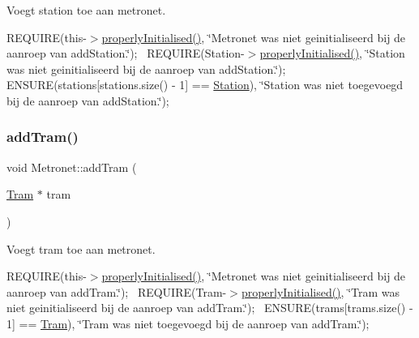 Voegt station toe aan metronet. 

R\+E\+Q\+U\+I\+RE(this-\/$>$\hyperlink{class_metronet_a3d2adce29a947f162924279b766de645}{properly\+Initialised()}, \char`\"{}\+Metronet was niet geinitialiseerd bij de aanroep van add\+Station.\char`\"{});~\newline
R\+E\+Q\+U\+I\+RE(Station-\/$>$\hyperlink{class_metronet_a3d2adce29a947f162924279b766de645}{properly\+Initialised()}, \char`\"{}\+Station was niet geinitialiseerd bij de aanroep van add\+Station.\char`\"{});~\newline
E\+N\+S\+U\+RE(stations\mbox{[}stations.\+size() -\/ 1\mbox{]} == \hyperlink{class_station}{Station}), \char`\"{}\+Station was niet toegevoegd bij de aanroep van add\+Station.\char`\"{});~\newline
\mbox{\label{class_metronet_ab9bcc898b7b0ec5571ce149364cf64fc}} 
\subsubsection{\texorpdfstring{add\+Tram()}{addTram()}}
{\footnotesize\ttfamily void Metronet\+::add\+Tram (\begin{DoxyParamCaption}\item[{\hyperlink{class_tram}{Tram} $\ast$}]{tram }\end{DoxyParamCaption})}



Voegt tram toe aan metronet. 

R\+E\+Q\+U\+I\+RE(this-\/$>$\hyperlink{class_metronet_a3d2adce29a947f162924279b766de645}{properly\+Initialised()}, \char`\"{}\+Metronet was niet geinitialiseerd bij de aanroep van add\+Tram.\char`\"{});~\newline
R\+E\+Q\+U\+I\+RE(Tram-\/$>$\hyperlink{class_metronet_a3d2adce29a947f162924279b766de645}{properly\+Initialised()}, \char`\"{}\+Tram was niet geinitialiseerd bij de aanroep van add\+Tram.\char`\"{});~\newline
E\+N\+S\+U\+RE(trams\mbox{[}trams.\+size() -\/ 1\mbox{]} == \hyperlink{class_tram}{Tram}), \char`\"{}\+Tram was niet toegevoegd bij de aanroep van add\+Tram.\char`\"{});~\newline
\mbox{\label{class_metronet_a0128de167ec0a36e70abd57170b3faed}} 
